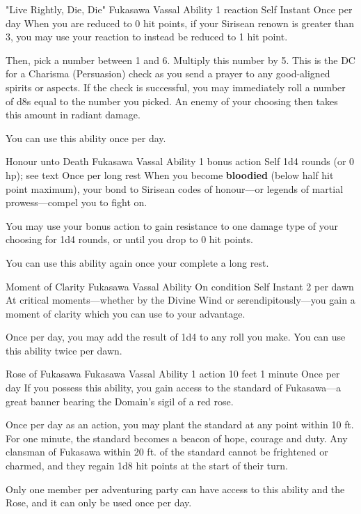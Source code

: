 \ability%
    {"Live Rightly, Die, Die"}
    {Fukasawa Vassal Ability}
    {1 reaction}
    {Self}
    {Instant}
    {Once per day}
When you are reduced to 0 hit points,
if your Sirisean renown is greater than 3,
you may use your reaction to
instead be reduced to 1 hit point.

Then, pick a number between 1 and 6.
Multiply this number by 5.
This is the DC for a Charisma (Persuasion) check
as you send a prayer to any good-aligned spirits or aspects.
If the check is successful,
you may immediately roll a number of d8s equal to
the number you picked.
An enemy of your choosing then takes this amount
in radiant damage.

You can use this ability once per day.


\ability%
    {Honour unto Death}
    {Fukasawa Vassal Ability}
    {1 bonus action}
    {Self}
    {1d4 rounds (or 0 hp); see text}
    {Once per long rest}
When you become \textbf{bloodied}
(below half hit point maximum),
your bond to Sirisean codes of honour---or
legends of martial prowess---compel you to fight on.

You may use your bonus action to gain resistance
to one damage type of your choosing for 1d4 rounds,
or until you drop to 0 hit points.

You can use this ability again once your complete a long rest.


\ability%
    {Moment of Clarity}
    {Fukasawa Vassal Ability}
    {On condition}
    {Self}
    {Instant}
    {2 per dawn}
At critical moments---whether by the Divine Wind
or serendipitously---you gain a moment of clarity
which you can use to your advantage.

Once per day,
you may add the result of 1d4 to any roll you make.
You can use this ability twice per dawn.


\ability%
    {Rose of Fukasawa}
    {Fukasawa Vassal Ability}
    {1 action}
    {10 feet}
    {1 minute}
    {Once per day}
If you possess this ability,
you gain access to the standard of Fukasawa---a
great banner bearing the Domain's sigil of a red rose.

Once per day as an action,
you may plant the standard at any point within 10 ft.
For one minute,
the standard becomes a beacon of hope, courage and duty.
Any clansman of Fukasawa within 20 ft. of the standard
cannot be frightened or charmed,
and they regain 1d8 hit points at the start of their turn.

Only one member per adventuring party can have
access to this ability and the Rose,
and it can only be used once per day.


